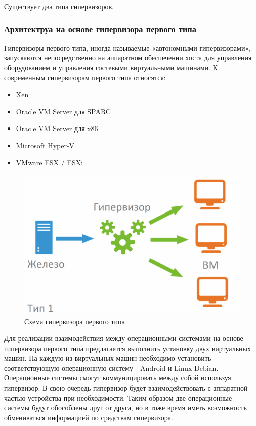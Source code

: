 \documentclass[a4paper, 14pt]{article}
\begin{document}
\par Существует два типа гипервизоров.

\subsubsection{Архитектруа на основе гипервизора первого типа}

\par Гипервизоры первого типа, иногда называемые «автономными гипервизорами», запускаются непосредственно на аппаратном обеспечении хоста для управления оборудованием и управления гостевыми виртуальными машинами. К современным гипервизорам первого типа относятся: 
\begin{itemize}
    \item Xen
    \item Oracle VM Server для SPARC
    \item Oracle VM Server для x86
    \item Microsoft Hyper-V
    \item VMware ESX / ESXi
\end{itemize}

\begin{figure}[h!]
	\centering
	\includegraphics[scale = 0.3]{images/type1.png}
	\caption{Схема гипервизора первого типа}
\end{figure}

\par Для реализации взаимодействия между операционными системами на основе гипервизора первого типа предлагается выполнить установку двух виртуальных машин. На каждую из виртуальных машин необходимо установить соответствующую операционную систему - Android и Linux Debian. Операционные системы смогут коммуницировать между собой используя гипервизор. В свою очередь гипервизор будет взаимодействовать с аппаратной частью устройства при необходимости. Таким образом две операционные системы будут обособлены друг от друга, но в тоже время иметь возможность обмениваться информацией по средствам гипервизора.
\end{document}
